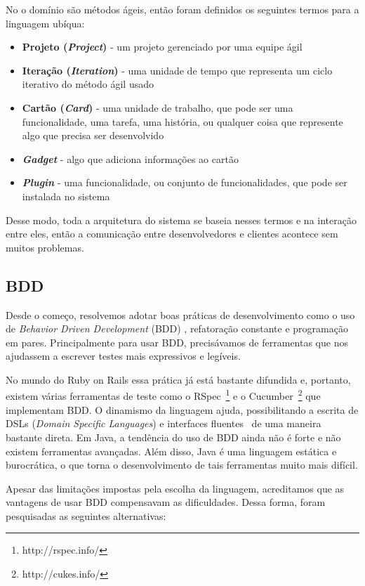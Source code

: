 No \calopsita{} o domínio são métodos ágeis, então foram definidos os seguintes termos para a linguagem ubíqua:

\begin{itemize}
	\item{\textbf{Projeto (\textit{Project})} - um projeto gerenciado por uma equipe ágil}
	\item{\textbf{Iteração (\textit{Iteration})} - uma unidade de tempo que representa um ciclo iterativo do método ágil usado}
	\item{\textbf{Cartão (\textit{Card})} - uma unidade de trabalho, que pode ser uma funcionalidade, uma tarefa, uma história, ou qualquer coisa que represente algo que precisa ser desenvolvido}
	\item{\textbf{\textit{Gadget}} - algo que adiciona informações ao cartão}
	\item{\textbf{\textit{Plugin}} - uma funcionalidade, ou conjunto de funcionalidades, que pode ser instalada no sistema}
\end{itemize}

Desse modo, toda a arquitetura do sistema se baseia nesses termos e na interação entre eles, então a comunicação entre desenvolvedores e clientes acontece sem muitos problemas.

\subsection{BDD} 
\label{bdd}

Desde o começo, resolvemos adotar boas práticas de desenvolvimento como o uso de \textit{Behavior Driven Development} (BDD) \cite{bdd}, refatoração constante e programação em pares. Principalmente para usar BDD, precisávamos de ferramentas que nos ajudassem a escrever testes mais expressivos e legíveis. 

No mundo do Ruby on Rails essa prática já está bastante difundida e, portanto, existem várias ferramentas de teste como o RSpec~\footnote{http://rspec.info/} e o Cucumber~\footnote{http://cukes.info/} que implementam BDD. O dinamismo da linguagem ajuda, possibilitando a escrita de DSLs (\textit{Domain Specific Languages}) e interfaces fluentes~\cite{dsl} de uma maneira bastante direta. Em Java, a tendência do uso de BDD ainda não é forte e não existem ferramentas avançadas. Além disso, Java é uma linguagem estática e burocrática, o que torna o desenvolvimento de tais ferramentas muito mais difícil. 

Apesar das limitações impostas pela escolha da linguagem, acreditamos que as vantagens de usar BDD compensavam as dificuldades. Dessa forma, foram pesquisadas as seguintes alternativas:

